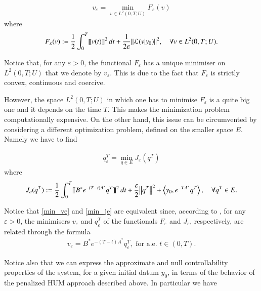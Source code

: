 \begin{align}\label{min_ve}
	v_\varepsilon=\min_{v\in L^2(0,T;U)} F_\varepsilon (v)
\end{align}
where
\begin{align*}
	F_\varepsilon(v):=\frac{1}{2}\int_0^T\llbracket v(t)\rrbracket^2\,dt+\frac{1}{2\varepsilon}{\left\|\mathcal L(v|y_0)\right\|}_{}^2, \quad \forall v\in L^2(0,T;U).
\end{align*}

Notice that, for any $\varepsilon > 0$, the functional $F_\varepsilon$ has a unique minimiser on $L^2(0,T;U)$  that we denote by $v_\varepsilon$. This is due to the fact that $F_\varepsilon$ is strictly convex, continuous and coercive. 

However, the space $L^2(0,T;U)$ in which one has to minimise $F_\varepsilon$ is a quite big one and it depends on the time $T$. This makes the minimization problem computationally expensive. On the other hand, this issue can be circumvented by considering a different optimization problem, defined on the smaller space $E$. Namely we have to find  

\begin{align}\label{min_je}
	q^T_\varepsilon=\min_{q\in E} J_\varepsilon (q^T)
\end{align}
where
\begin{align}\label{penalized_fun}
	J_\varepsilon(q^T):=\frac{1}{2}\int_0^T\llbracket B^*e^{-(T-t)A^*}q^T\rrbracket^2\,dt+\frac{\varepsilon}{2}{\left\|q^T\right\|}_{}^2 + \left\langle y_0,e^{-TA^*}q^T\right\rangle, \quad \forall q^T\in E.
\end{align}

Notice that \eqref{min_ve} and \eqref{min_je} are equivalent since, according to \cite[Proposition 1.5]{boyer2013penalised}, for any $\varepsilon > 0$, the minimisers $v_\varepsilon$ and $q_\varepsilon^T$ of the functionals $F_\varepsilon$ and $J_\varepsilon$, respectively, are related through the formula
\begin{align*}
	v_\varepsilon = B^*e^{-(T-t)A^*}q_\varepsilon^T, \textrm{ for a.e. } t\in(0,T).
\end{align*} 

Notice also that we can express the approximate and null controllability properties of the system, for a given initial datum $y_0$, in terms of the behavior of the penalized HUM approach described above. In particular we have 

